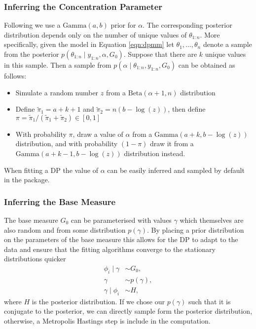 \documentclass[nojss]{jss}
\begin{document}
\subsubsection{Inferring the Concentration Parameter}\label{subsubsec:concentration}
Following \cite{west_hyperparameter_1992} we use a $\text{Gamma} (a, b)$ prior for $\alpha$. The corresponding posterior distribution depends only on the number of unique values of $\theta_{1:n}$. More specifically, given the model in Equation \eqref{eqn:dpmm} let $\theta_1,\ldots,\theta_n$ denote a sample from the posterior $p(\theta_{1:n} \mid y_{1:n} , \alpha, G_0 )$. Suppose that there are $k$ unique values in this sample. Then a sample from $p(\alpha \mid \theta_{1:n}, y_{1:n} , G_0)$ can be obtained as follows:

\begin{itemize}
\item Simulate a random number $z$ from a $\text{Beta}(\alpha + 1, n)$ distribution
\item Define $\tilde{\pi}_1 = a + k + 1$ and $\tilde{\pi}_2 = n (b - \log(z))$, then define $\pi = \tilde{\pi}_1/(\tilde{\pi}_1 + \tilde{\pi}_2) \in [0, 1]$
\item With probability $\pi$, draw a value of $\alpha$ from a $\text{Gamma} (a + k, b - \log(z))$ distribution, and with probability $(1 - \pi)$ draw it from a $\text{Gamma}(a + k - 1, b - \log(z))$ distribution instead.
\end{itemize}
When fitting a DP the value of $\alpha$ can be easily inferred and sampled by default in the  package.

\subsubsection{Inferring the Base Measure}

The base measure $G_0$ can be parameterised with values $\gamma$ which themselves are also random and from some distribution $p(\gamma)$. By placing a prior distribution on the parameters of the base measure this allows for the DP to adapt to the data and ensure that the fitting algorithms converge to the stationary distributions quicker
\begin{align*}
\phi _i \mid \gamma & \sim G_0, \\
\gamma & \sim p(\gamma), \\
\gamma \mid \phi _i & \sim H,
\end{align*}
where $H$ is the posterior distribution. If we chose our $p(\gamma)$ such that it is conjugate to the posterior, we can directly sample form the posterior distribution, otherwise, a Metropolis Hastings step is include in the computation.
\end{document}
